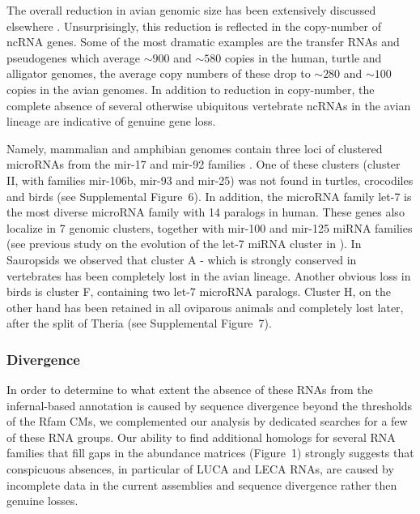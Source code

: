 \documentclass[10pt]{bmc_article}
\newenvironment{bmcformat}{\begin{raggedright}\baselineskip20pt\sloppy\setboolean{publ}{false}}{\end{raggedright}\baselineskip20pt\sloppy}
\begin{document}
\begin{bmcformat}
The overall reduction in avian genomic size has been extensively
discussed elsewhere \cite{Organ:2007}. Unsurprisingly, this reduction
is reflected in the copy-number of ncRNA genes. Some of the most
dramatic examples are the transfer RNAs and pseudogenes which average
$\sim900$ and $\sim580$ copies in the human, turtle and alligator
genomes, the average copy numbers of these drop to $\sim280$ and
$\sim100$ copies in the avian genomes. In addition to reduction in
copy-number, the complete absence of several otherwise ubiquitous
vertebrate ncRNAs in the avian lineage are indicative of genuine gene
loss. 

Namely, mammalian and amphibian genomes contain three loci of
clustered microRNAs from the mir-17 and mir-92 families
\cite{Tanzer:04}. One of these clusters (cluster II, with families
mir-106b, mir-93 and mir-25) was not found in turtles, crocodiles and
birds (see Supplemental Figure~6). In addition, the microRNA family
let-7 is the most diverse microRNA family with 14 paralogs in
human. These genes also localize in 7 genomic clusters, together with
mir-100 and mir-125 miRNA families (see previous study on the
evolution of the let-7 miRNA cluster in \cite{Hertel:2012}). In Sauropsids we
observed that cluster A - which is strongly conserved in vertebrates
has been completely lost in the avian lineage.  Another obvious loss
in birds is cluster F, containing two let-7 microRNA paralogs. Cluster
H, on the other hand has been retained in all oviparous animals and
completely lost later, after the split of Theria (see Supplemental
Figure~7).

\subsubsection*{Divergence}

In order to determine to what extent the absence of these RNAs from
the infernal-based annotation is caused by sequence divergence beyond
the thresholds of the Rfam CMs, we complemented our analysis by
dedicated searches for a few of these RNA groups. Our ability to find
additional homologs for several RNA families that fill gaps in the
abundance matrices (Figure~1) strongly suggests that conspicuous
absences, in particular of LUCA and LECA RNAs, are caused by
incomplete data in the current assemblies and sequence divergence
rather then genuine losses.


\end{bmcformat}
\end{document}
